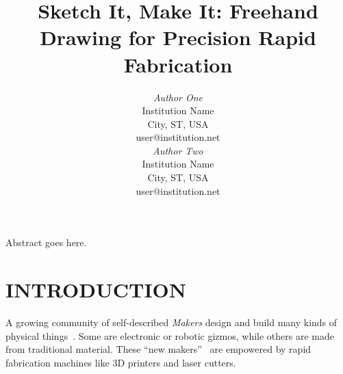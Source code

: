 \documentclass{article}
\begin{document}

\toappear{}



\title{Sketch It, Make It: Freehand Drawing for Precision Rapid Fabrication}

\author{
\parbox[t]{9cm}{\centering
	     {\em Author One}\\
	     Institution Name\\
             City, ST, USA\\
	     user@institution.net}
\parbox[t]{9cm}{\centering
	     {\em Author Two}\\
	     Institution Name\\
             City, ST, USA\\
	     user@institution.net}
}

\maketitle

\abstract Abstract goes here. 






\section{INTRODUCTION}

A growing community of self-described \textit{Makers} design and build
many kinds of physical things~\cite{gershenfeld-fab}. Some are
electronic or robotic gizmos, while others are made from traditional
material. These ``new makers''~\cite{gross-new-makers} are empowered
by rapid fabrication machines like 3D printers and laser
cutters. 
\end{document}
